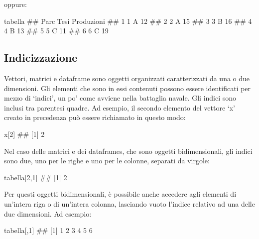 \documentclass[a4paper,12pt,oneside]{book}
\newenvironment{Shaded}{\begin{snugshade}}{\end{snugshade}}
\newcommand{\DecValTok}[1]{#1}
\newcommand{\DocumentationTok}[1]{#1}
\newcommand{\NormalTok}[1]{#1}
\begin{document}
oppure:

\begin{Shaded}
\begin{Highlighting}[]
\NormalTok{tabella}
\DocumentationTok{\#\#   Parc Tesi Produzioni}
\DocumentationTok{\#\# 1    1    A         12}
\DocumentationTok{\#\# 2    2    A         15}
\DocumentationTok{\#\# 3    3    B         16}
\DocumentationTok{\#\# 4    4    B         13}
\DocumentationTok{\#\# 5    5    C         11}
\DocumentationTok{\#\# 6    6    C         19}
\end{Highlighting}
\end{Shaded}

\hypertarget{indicizzazione}{%
\subsection{Indicizzazione}\label{indicizzazione}}

Vettori, matrici e dataframe sono oggetti organizzati caratterizzati da una o due dimensioni. Gli elementi che sono in essi contenuti possono essere identificati per mezzo di `indici', un po' come avviene nella battaglia navale. Gli indici sono inclusi tra parentesi quadre. Ad esempio, il secondo elemento del vettore `x' creato in precedenza può essere richiamato in questo modo:

\begin{Shaded}
\begin{Highlighting}[]
\NormalTok{x[}\DecValTok{2}\NormalTok{]}
\DocumentationTok{\#\# [1] 2}
\end{Highlighting}
\end{Shaded}

Nel caso delle matrici e dei dataframes, che sono oggetti bidimensionali, gli indici sono due, uno per le righe e uno per le colonne, separati da virgole:

\begin{Shaded}
\begin{Highlighting}[]
\NormalTok{tabella[}\DecValTok{2}\NormalTok{,}\DecValTok{1}\NormalTok{]}
\DocumentationTok{\#\# [1] 2}
\end{Highlighting}
\end{Shaded}

Per questi oggetti bidimensionali, è possibile anche accedere agli elementi di un'intera riga o di un'intera colonna, lasciando vuoto l'indice relativo ad una delle due dimensioni. Ad esempio:

\begin{Shaded}
\begin{Highlighting}[]
\NormalTok{tabella[,}\DecValTok{1}\NormalTok{]}
\DocumentationTok{\#\# [1] 1 2 3 4 5 6}
\end{Highlighting}
\end{Shaded}
\end{document}
